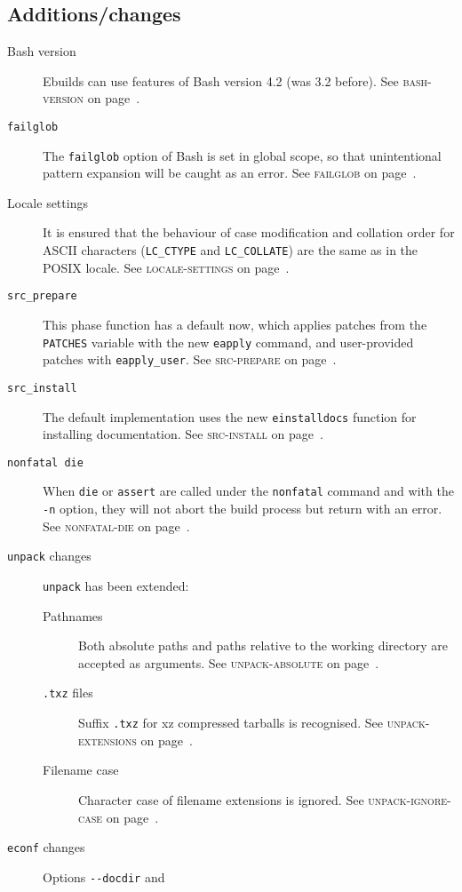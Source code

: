 \documentclass[a4paper,nofoldmark]{leaflet}
\newcommand{\code}[1]{\texttt{#1}}
\newcommand{\featureref}[1]{\textsc{#1} on page~\pageref{feat:#1}}
\begin{document}
\subsection{Additions/changes}
\label{sec:cs:eapi6-additions}
\begin{description}
    \item[Bash version] Ebuilds can use features of Bash version 4.2
    (was 3.2 before).
    See \featureref{bash-version}.
    \item[\code{failglob}] The \code{failglob} option of Bash is set
    in global scope, so that unintentional pattern expansion will be
    caught as an error.
    See \featureref{failglob}.
    \item[Locale settings] It is ensured that the behaviour of case
    modification and collation order for ASCII characters
    (\code{LC_CTYPE} and \code{LC_COLLATE}) are the same as in the
    POSIX locale.
    See \featureref{locale-settings}.
    \item[\code{src_prepare}] This phase function has a default now,
    which applies patches from the \code{PATCHES} variable with the
    new \code{eapply} command, and user-provided patches with
    \code{eapply_user}.
    See \featureref{src-prepare}.
    \item[\code{src_install}] The default implementation uses the new
    \code{einstalldocs} function for installing documentation.
    See \featureref{src-install}.
    \item[\code{nonfatal die}] When \code{die} or \code{assert} are
    called under the \code{nonfatal} command and with the \code{-n}
    option, they will not abort the build process but return with an
    error.
    See \featureref{nonfatal-die}.
    \item[\code{unpack} changes] \code{unpack} has been extended:
    \begin{description}
        \item[Pathnames] Both absolute paths and paths relative to the
        working directory are accepted as arguments.
        See \featureref{unpack-absolute}.
        \item[\code{.txz} files] Suffix \code{.txz} for xz compressed
        tarballs is recognised.
        See \featureref{unpack-extensions}.
        \item[Filename case] Character case of filename extensions is
        ignored.
        See \featureref{unpack-ignore-case}.
    \end{description}
    \item[\code{econf} changes] Options \code{-{}-docdir} and

\end{description}
\end{document}

